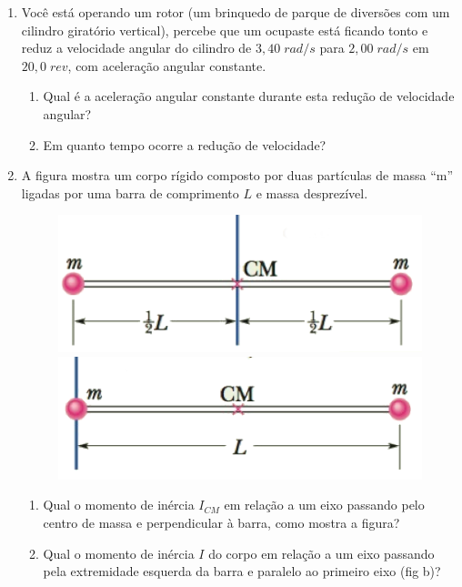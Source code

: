 \documentclass[brazil]{article}
\begin{document}
\begin{enumerate}
\item Você está operando um rotor (um brinquedo de parque de diversões com um cilindro giratório vertical), percebe que um ocupaste está ficando tonto e reduz a velocidade angular do cilindro de $3,40\;rad/s$ para $2,00\;rad/s$ em $20,0\;rev$, com aceleração angular constante.
\begin{enumerate}
\item Qual é a aceleração angular constante durante esta redução de velocidade angular?
\item Em quanto tempo ocorre a redução de velocidade?
\end{enumerate}


\item A figura mostra um corpo rígido composto por duas partículas de massa ``m'' ligadas por uma barra de comprimento $L$ e massa desprezível.
\begin{figure}[H]
\hfill
\includegraphics[scale=0.4]{figs/duas-particulas01.png}\hfill
\includegraphics[scale=0.4]{figs/duas-particulas02.png}
\end{figure}
\begin{enumerate}
\item Qual o momento de inércia $I_{CM}$ em relação a um eixo passando pelo centro de massa e perpendicular à barra, como mostra a figura?
\item Qual o momento de inércia $I$ do corpo em relação a um eixo passando pela extremidade esquerda da barra e paralelo ao primeiro eixo (fig b)?
\end{enumerate}



\end{enumerate}
\end{document}
